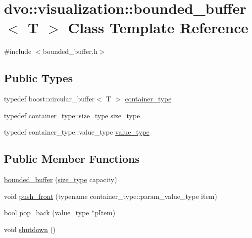 \hypertarget{classdvo_1_1visualization_1_1bounded__buffer}{}\section{dvo\+:\+:visualization\+:\+:bounded\+\_\+buffer$<$ T $>$ Class Template Reference}
\label{classdvo_1_1visualization_1_1bounded__buffer}


{\ttfamily \#include $<$bounded\+\_\+buffer.\+h$>$}

\subsection*{Public Types}
\begin{DoxyCompactItemize}
\item 
typedef boost\+::circular\+\_\+buffer$<$ T $>$ \mbox{\hyperlink{classdvo_1_1visualization_1_1bounded__buffer_aaeb9b2a645cb183a85167be95f09745b}{container\+\_\+type}}
\item 
typedef container\+\_\+type\+::size\+\_\+type \mbox{\hyperlink{classdvo_1_1visualization_1_1bounded__buffer_a0b8808bbfd4de59ebf33d5241083179c}{size\+\_\+type}}
\item 
typedef container\+\_\+type\+::value\+\_\+type \mbox{\hyperlink{classdvo_1_1visualization_1_1bounded__buffer_a69f22957276557660f1bf8b654e3a667}{value\+\_\+type}}
\end{DoxyCompactItemize}
\subsection*{Public Member Functions}
\begin{DoxyCompactItemize}
\item 
\mbox{\hyperlink{classdvo_1_1visualization_1_1bounded__buffer_a392dce467c80a3b980be50ed2f538181}{bounded\+\_\+buffer}} (\mbox{\hyperlink{classdvo_1_1visualization_1_1bounded__buffer_a0b8808bbfd4de59ebf33d5241083179c}{size\+\_\+type}} capacity)
\item 
void \mbox{\hyperlink{classdvo_1_1visualization_1_1bounded__buffer_a2b72854b9be8a3c4831f9f46d2c4a549}{push\+\_\+front}} (typename container\+\_\+type\+::param\+\_\+value\+\_\+type item)
\item 
bool \mbox{\hyperlink{classdvo_1_1visualization_1_1bounded__buffer_a86bb8a4d2211061d0dda2cbf9a9a82e7}{pop\+\_\+back}} (\mbox{\hyperlink{classdvo_1_1visualization_1_1bounded__buffer_a69f22957276557660f1bf8b654e3a667}{value\+\_\+type}} $\ast$p\+Item)
\item 
void \mbox{\hyperlink{classdvo_1_1visualization_1_1bounded__buffer_ae4afdb9c626f4f38cbc34b81fdfa8bf7}{shutdown}} ()
\end{DoxyCompactItemize}


